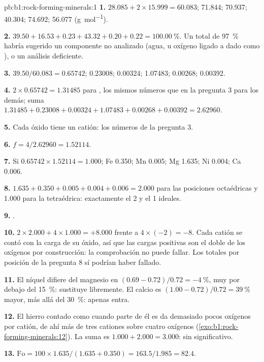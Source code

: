 \begin{solution}{pb:b1:rock-forming-minerals:1}
\textbf{1.}  $28.085 + 2\times15.999 = 60.083$;  71.844;
 70.937;  40.304;  74.692;  56.077
(\si{g.mol^{-1}}).

\textbf{2.} $39.50 + 16.53 + 0.23 + 43.32 + 0.20 + 0.22 =
\qty{100.00}{\percent}$. Un total de \qty{97}{\percent} habría sugerido un componente no analizado (agua, u
oxígeno ligado a  dado como ), o un análisis deficiente.

\textbf{3.}  $39.50/60.083 = 0.65742$;  0.23008; 
0.00324;  1.07483;  0.00268;  0.00392.

\textbf{4.} $2\times0.65742 = 1.31485$ para , los mismos números que en la
pregunta 3 para los demás; suma $1.31485 + 0.23008 + 0.00324 + 1.07483 +
0.00268 + 0.00392 = 2.62960$.

\textbf{5.} Cada óxido tiene un catión: los números de la pregunta 3.

\textbf{6.} $f = 4/2.62960 = 1.52114$.

\textbf{7.} Si $0.65742\times1.52114 = 1.000$; Fe 0.350; Mn 0.005; Mg 1.635;
Ni 0.004; Ca 0.006.

\textbf{8.} $1.635 + 0.350 + 0.005 + 0.004 + 0.006 = 2.000$ para las posiciones
octaédricas y 1.000 para la tetraédrica: exactamente el 2 y el 1 ideales.

\textbf{9.} .

\textbf{10.} $2\times2.000 + 4\times1.000 = +8.000$ frente a $4\times(-2) =
-8$. Cada catión se contó con la carga de su óxido, así que las cargas positivas son el doble de los
oxígenos por construcción: la comprobación no puede fallar. Los totales por posición de la pregunta 8 sí
podrían haber fallado.

\textbf{11.} El níquel difiere del magnesio en
$(0.69 - 0.72)/0.72 = -\qty{4}{\percent}$, muy por debajo del \qty{15}{\percent}: sustituye libremente. El calcio
es $(1.00 - 0.72)/0.72 = \qty{39}{\percent}$ mayor, más allá del \qty{30}{\percent}: apenas entra.

\textbf{12.} El hierro contado como  cuando parte de él es  da
demasiado pocos oxígenos por catión, de ahí más de tres cationes sobre cuatro oxígenos
(\cref{exo:b1:rock-forming-minerals:12}). La suma es $1.000 + 2.000 = 3.000$: sin  significativo.

\textbf{13.} $\mathrm{Fo} = 100\times1.635/(1.635 + 0.350) = 163.5/1.985 =
82.4$.


\end{solution}
